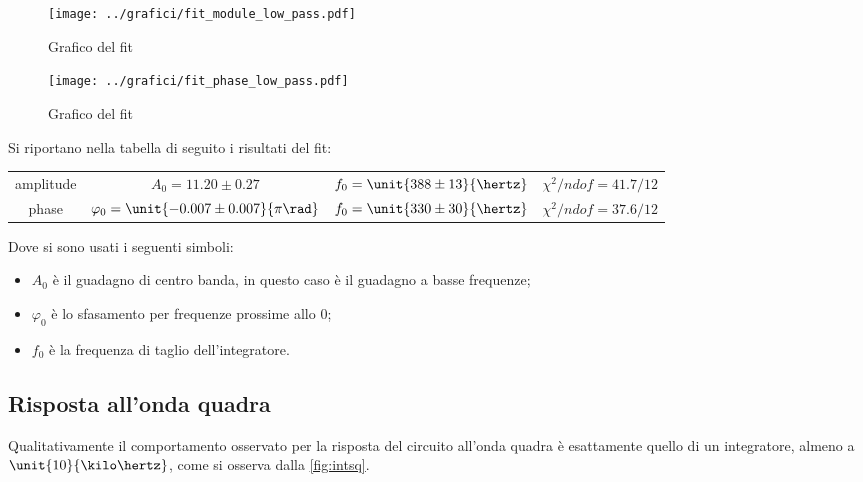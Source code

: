 \documentclass[10pt,a4paper]{article}
\begin{document}
\begin{figure}[h!]
	\centering
	\texttt{[image: ../grafici/fit\_module\_low\_pass.pdf]}
	\caption{Grafico del fit }
	\label{fig:lowamp}
\end{figure}
\begin{figure}[h!]
	\centering
	\texttt{[image: ../grafici/fit\_phase\_low\_pass.pdf]}
	\caption{Grafico del fit }
	\label{fig:lowph}
\end{figure}

Si riportano nella tabella di seguito i risultati del fit:

\begin{table}[h!]
\centering
\begin{tabular}{c|ccc}
amplitude	&	$A_0 = 11.20 \pm 0.27$	&	$f_0 = \unit{388 \pm 13}{\hertz}$	&	$\chi^2/ndof = 41.7 / 12$\\
phase		&	$\varphi_0 = \unit{-0.007 \pm 0.007}{\pi \rad}$	&	$f_0 = \unit{330 \pm 30}{\hertz}$	&	$\chi^2/ndof = 37.6 / 12$
\end{tabular}
\end{table}

\noindent Dove si sono usati i seguenti simboli:
\begin{itemize}
\item $A_0$ è il guadagno di centro banda, in questo caso è il guadagno a basse frequenze;
\item $\varphi_0$ è lo sfasamento per frequenze prossime allo 0;
\item $f_0$ è la frequenza di taglio dell'integratore.
\end{itemize}


\subsection{Risposta all'onda quadra}


Qualitativamente il comportamento osservato per la risposta del circuito all'onda quadra è esattamente quello di un integratore, almeno a $\unit{10}{\kilo\hertz}$, come si osserva dalla \figurename{\ref{fig:intsq}}.
\end{document}

